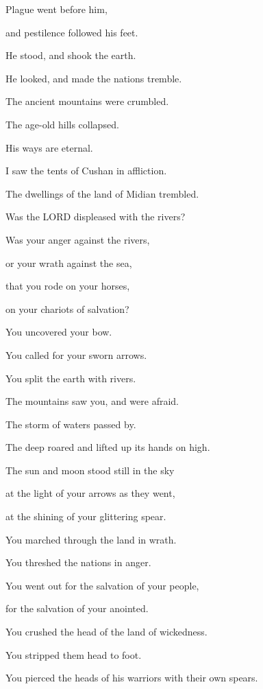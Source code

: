 \myverse{}Plague went before him,

and pestilence followed his feet.


\myverse{}He stood, and shook the earth.

He looked, and made the nations tremble.

The ancient mountains were crumbled.

The age-old hills collapsed.

His ways are eternal.


\myverse{}I saw the tents of Cushan in affliction.

The dwellings of the land of Midian trembled.


\myverse{}Was the LORD displeased with the rivers?

Was your anger against the rivers,

or your wrath against the sea,

that you rode on your horses,

on your chariots of salvation?


\myverse{}You uncovered your bow.

You called for your sworn arrows.

\vspace{\baselineskip}

You split the earth with rivers.


\myverse{}The mountains saw you, and were afraid.

The storm of waters passed by.

The deep roared and lifted up its hands on high.


\myverse{}The sun and moon stood still in the sky

at the light of your arrows as they went,

at the shining of your glittering spear.


\myverse{}You marched through the land in wrath.

You threshed the nations in anger.


\myverse{}You went out for the salvation of your people,

for the salvation of your anointed.

You crushed the head of the land of wickedness.

You stripped them head to foot.

\vspace{\baselineskip} 

\myverse{}You pierced the heads of his warriors with their own spears.

